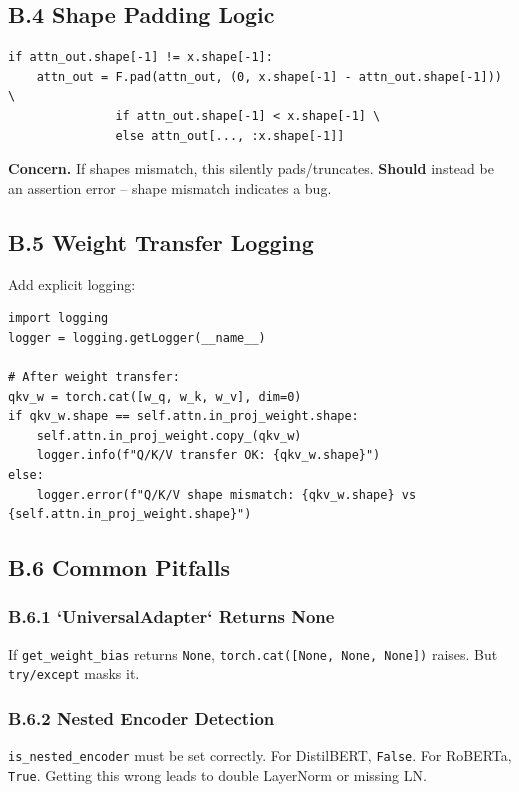 \subsection{B.4 Shape Padding Logic}

\begin{lstlisting}
if attn_out.shape[-1] != x.shape[-1]:
    attn_out = F.pad(attn_out, (0, x.shape[-1] - attn_out.shape[-1])) \
               if attn_out.shape[-1] < x.shape[-1] \
               else attn_out[..., :x.shape[-1]]
\end{lstlisting}

\textbf{Concern.} If shapes mismatch, this silently pads/truncates. \textbf{Should} 
instead be an assertion error -- shape mismatch indicates a bug.

\subsection{B.5 Weight Transfer Logging}

Add explicit logging:

\begin{lstlisting}
import logging
logger = logging.getLogger(__name__)

# After weight transfer:
qkv_w = torch.cat([w_q, w_k, w_v], dim=0)
if qkv_w.shape == self.attn.in_proj_weight.shape:
    self.attn.in_proj_weight.copy_(qkv_w)
    logger.info(f"Q/K/V transfer OK: {qkv_w.shape}")
else:
    logger.error(f"Q/K/V shape mismatch: {qkv_w.shape} vs {self.attn.in_proj_weight.shape}")
\end{lstlisting}

\subsection{B.6 Common Pitfalls}

\subsubsection{B.6.1 `UniversalAdapter` Returns None}

If \texttt{get\_weight\_bias} returns \texttt{None}, \texttt{torch.cat([None, None, None])} raises. 
But \texttt{try/except} masks it.

\subsubsection{B.6.2 Nested Encoder Detection}

\texttt{is\_nested\_encoder} must be set correctly. For DistilBERT, \texttt{False}. For 
RoBERTa, \texttt{True}. Getting this wrong leads to double LayerNorm or missing LN.

